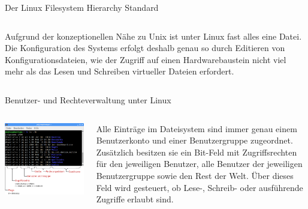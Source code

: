 {\begin{frame}[allowframebreaks]{Der Linux Filesystem Hierarchy Standard}
\begin{columns}[T]
        \parbox{\linewidth}{
            Aufgrund der konzeptionellen Nähe zu Unix ist unter Linux fast alles
            eine Datei. Die Konfiguration des Systems erfolgt deshalb genau so
            durch Editieren von Konfigurationsdateien, wie der Zugriff auf einen
            Hardwarebaustein nicht viel mehr als das Lesen und Schreiben virtueller
            Dateien erfordert.
        }
    \end{columns}
\end{frame}
}

{
\footnotesize
\setlength{\leftmargini}{1.2em}

\begin{frame}[allowframebreaks]{Benutzer- und Rechteverwaltung unter Linux}
    \begin{columns}[onlytextwidth]
        \includegraphics[width=\textwidth]{8-linux/img/rechte-dateizugriff}

        \parbox{\linewidth}{
            Alle Einträge im Dateisystem sind immer genau einem Benutzerkonto
            und einer Benutzergruppe zugeordnet. Zusätzlich besitzen sie ein
            Bit-Feld mit Zugriffsrechten für den jeweiligen Benutzer, alle
            Benutzer der jeweiligen Benutzergruppe sowie den Rest der Welt.
            Über dieses Feld wird gesteuert, ob Lese-, Schreib- oder ausführende
            Zugriffe erlaubt sind.

}
\end{columns}
\end{frame}}
